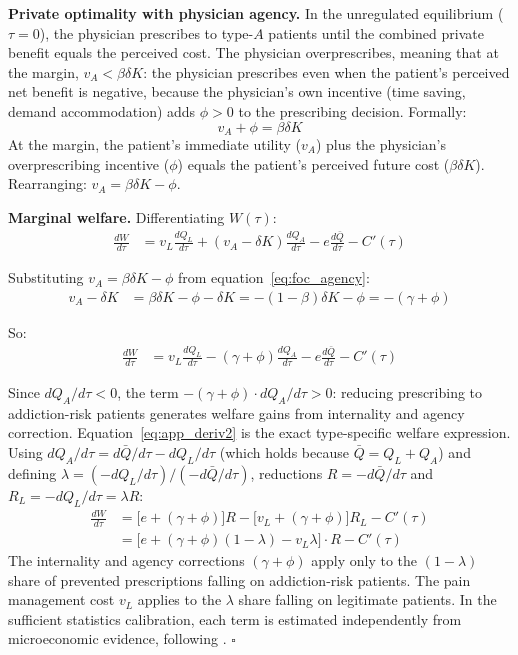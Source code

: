 \documentclass[12pt]{article}
\begin{document}
\textbf{Private optimality with physician agency.} In the unregulated equilibrium ($\tau = 0$), the physician prescribes to type-$A$ patients until the combined private benefit equals the perceived cost. The physician overprescribes, meaning that at the margin, $v_A < \beta \delta K$: the physician prescribes even when the patient's perceived net benefit is negative, because the physician's own incentive (time saving, demand accommodation) adds $\phi > 0$ to the prescribing decision. Formally:
\begin{equation}\label{eq:foc_agency}
v_A + \phi = \beta \delta K
\end{equation}
At the margin, the patient's immediate utility ($v_A$) plus the physician's overprescribing incentive ($\phi$) equals the patient's perceived future cost ($\beta \delta K$). Rearranging: $v_A = \beta \delta K - \phi$.

\textbf{Marginal welfare.} Differentiating $W(\tau)$:
\begin{align}
\frac{dW}{d\tau} &= v_L \frac{dQ_L}{d\tau} + (v_A - \delta K) \frac{dQ_A}{d\tau} - e \frac{d\bar{Q}}{d\tau} - C'(\tau) \label{eq:app_deriv1}
\end{align}

Substituting $v_A = \beta \delta K - \phi$ from equation~\eqref{eq:foc_agency}:
\begin{align}
v_A - \delta K &= \beta \delta K - \phi - \delta K = -(1 - \beta)\delta K - \phi = -(\gamma + \phi) \label{eq:app_sub}
\end{align}

So:
\begin{align}
\frac{dW}{d\tau} &= v_L \frac{dQ_L}{d\tau} - (\gamma + \phi) \frac{dQ_A}{d\tau} - e \frac{d\bar{Q}}{d\tau} - C'(\tau) \label{eq:app_deriv2}
\end{align}

Since $dQ_A/d\tau < 0$, the term $-(\gamma + \phi) \cdot dQ_A/d\tau > 0$: reducing prescribing to addiction-risk patients generates welfare gains from internality and agency correction. Equation~\eqref{eq:app_deriv2} is the exact type-specific welfare expression. Using $dQ_A/d\tau = d\bar{Q}/d\tau - dQ_L/d\tau$ (which holds because $\bar{Q} = Q_L + Q_A$) and defining $\lambda = (-dQ_L/d\tau)/(-d\bar{Q}/d\tau)$, reductions $R = -d\bar{Q}/d\tau$ and $R_L = -dQ_L/d\tau = \lambda R$:
\begin{align}
\frac{dW}{d\tau} &= \Big[e + (\gamma + \phi)\Big]R - \Big[v_L + (\gamma + \phi)\Big]R_L - C'(\tau) \nonumber \\
&= \Big[e + (\gamma + \phi)(1-\lambda) - v_L\lambda\Big] \cdot R - C'(\tau) \label{eq:app_final}
\end{align}
The internality and agency corrections $(\gamma + \phi)$ apply only to the $(1-\lambda)$ share of prevented prescriptions falling on addiction-risk patients. The pain management cost $v_L$ applies to the $\lambda$ share falling on legitimate patients. In the sufficient statistics calibration, each term is estimated independently from microeconomic evidence, following \citet{chetty2009sufficient}. \hfill $\square$
\end{document}
